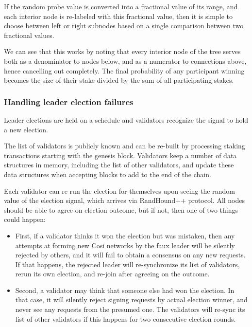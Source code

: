\documentclass[a4paper, 10pt, conference]{ieeeconf}
\begin{document}
If the random probe value is converted into a fractional value of its range, and each interior node is re-labeled with this fractional value, then it is simple to choose between left or right subnodes based on a single comparison between two fractional values.

We can see that this works by noting that every interior node of the tree serves both as a denominator to nodes below, and as a numerator to connections above, hence cancelling out completely. The final probability of any participant winning becomes the size of their stake divided by the sum of all participating stakes.

\subsubsection{Handling leader election failures} 
Leader elections are held on a schedule and validators recognize the signal to hold a new election. 

The list of validators is publicly known and can be re-built by processing staking transactions starting with the genesis block. Validators keep a number of data structures in memory, including the list of other validators, and update these data structures when accepting blocks to add to the end of the chain.

Each validator can re-run the election for themselves upon seeing the random value of the election signal, which arrives via RandHound++ protocol. All nodes should be able to agree on election outcome, but if not, then one of two things could happen: 

\begin{itemize}
	\item{First, if a validator thinks it won the election but was mistaken, then any attempts at forming new Cosi networks by the faux leader will be silently rejected by others, and it will fail to obtain a consensus on any new requests. If that happens, the rejected leader will re-synchronize its list of validators, rerun its own election, and re-join after agreeing on the outcome.} 
	\item{Second, a validator may think that someone else had won the election. In that case, it will silently reject signing requests by actual election winner, and never see any requests from the presumed one. The validators will re-sync its list of other validators if this happens for two consecutive election rounds.}
\end{itemize}
\end{document}

